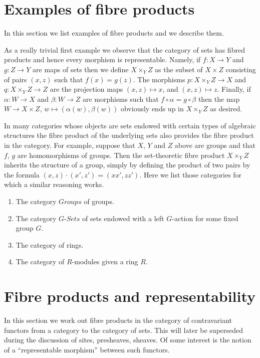 \section{Examples of fibre products}
\label{section-example-fibre-products}

\noindent
In this section we list examples of fibre products and
we describe them.

\medskip\noindent
As a really trivial first example we observe
that the category of sets has fibred products and hence every
morphism is representable. Namely, if $f : X \to Y$
and $g : Z \to Y$ are maps of sets then we define
$X \times_Y Z$ as the subset of $X \times Z$ consisting
of pairs $(x, z)$ such that $f(x) = g(z)$. The morphisms
$p : X \times_Y Z \to X$ and $q : X \times_Y Z \to Z$ are
the projection maps $(x, z) \mapsto x$, and $(x, z) \mapsto z$.
Finally, if $\alpha : W \to X$ and $\beta : W \to Z$
are morphisms such that $f \circ \alpha = g \circ \beta$
then the map $W \to X \times Z$, $w\mapsto (\alpha(w), \beta(w))$
obviously ends up in $X \times_Y Z$ as desired.

\medskip\noindent
In many categories whose objects are sets endowed with certain types of
algebraic structures the fibre product of the underlying sets also
provides the fibre product in the category. For example, suppose
that $X$, $Y$ and $Z$ above are groups and that $f$, $g$ are
homomorphisms of groups. Then the set-theoretic fibre product
$X \times_Y Z$ inherits the structure of a group, simply by
defining the product of two pairs by the formula
$(x, z) \cdot (x', z') = (xx', zz')$. Here we list those categories
for which a similar reasoning works.
\begin{enumerate}
\item The category $\textit{Groups}$ of groups.
\item The category $G\textit{-Sets}$ of sets
endowed with a left $G$-action for some fixed group $G$.
\item The category of rings.
\item The category of $R$-modules given a ring $R$.
\end{enumerate}




\section{Fibre products and representability}
\label{section-representable-map-presheaves}

\noindent
In this section we work out fibre products in the
category of contravariant functors from a category
to the category of sets. This will later be superseded
during the discussion of sites, presheaves, sheaves. Of some
interest is the notion of a ``representable morphism'' between
such functors.


